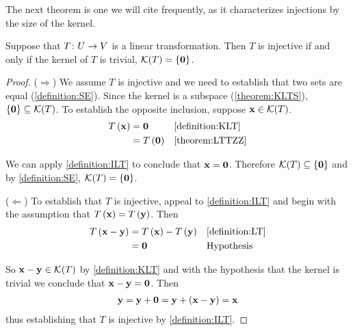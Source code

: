 \documentclass{ximera}
\begin{document}
The next theorem is one we will cite frequently, as it characterizes injections by the size of the kernel.


\begin{theorem}
\label{theorem:KILT}


Suppose that $T\colon U\rightarrow V$ is a linear transformation.  Then $T$ is injective if and only if the kernel of $T$ is trivial, $\mathcal{K}\!\left(T\right)=\left\{\mathbf{0}\right\}$.




\begin{proof}
($\Rightarrow$) We assume $T$ is injective and we need to establish that two sets are equal (\ref{definition:SE}).  Since the kernel is a subspace (\ref{theorem:KLTS}), $\left\{\mathbf{0}\right\}\subseteq\mathcal{K}\!\left(T\right)$.  To establish the opposite inclusion, suppose $\mathbf{x}\in\mathcal{K}\!\left(T\right)$.
\begin{align*}
T\left(\mathbf{x}\right)
&=\mathbf{0}&&\ref{definition:KLT}\\
&=T\left(\mathbf{0}\right)
&&\ref{theorem:LTTZZ}
\end{align*}




We can apply \ref{definition:ILT} to conclude that $\mathbf{x}=\mathbf{0}$.  Therefore $\mathcal{K}\!\left(T\right)\subseteq\left\{\mathbf{0}\right\}$ and by \ref{definition:SE}, $\mathcal{K}\!\left(T\right)=\left\{\mathbf{0}\right\}$.



($\Leftarrow$)  To establish that $T$ is injective, appeal to \ref{definition:ILT} and begin with the assumption that $T\left(\mathbf{x}\right)=T\left(\mathbf{y}\right)$.  Then
\begin{align*}
T\left(\mathbf{x}-\mathbf{y}\right)
&=T\left(\mathbf{x}\right)-T\left(\mathbf{y}\right)
&&\ref{definition:LT}\\
&=\mathbf{0}
&&\text{Hypothesis}
\end{align*}




So $\mathbf{x}-\mathbf{y}\in\mathcal{K}\!\left(T\right)$ by \ref{definition:KLT} and with the hypothesis that the kernel is trivial we conclude that $\mathbf{x}-\mathbf{y}=\mathbf{0}$.  Then
\begin{align*}
\mathbf{y}
=\mathbf{y}+\mathbf{0}
=\mathbf{y}+\left(\mathbf{x}-\mathbf{y}\right)
=\mathbf{x}
\end{align*}
thus establishing that $T$ is injective by \ref{definition:ILT}.



\end{proof}
\end{theorem}
\end{document}

